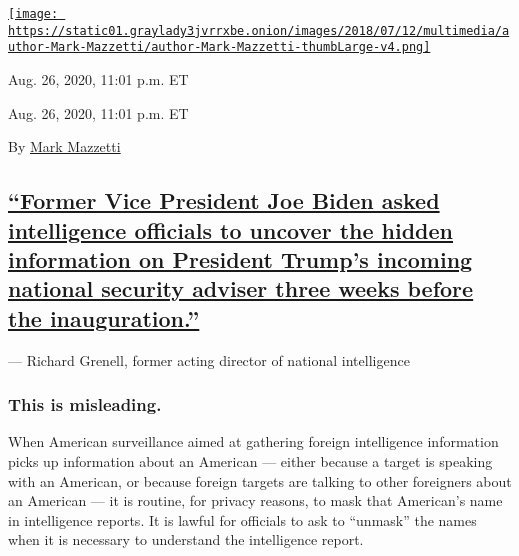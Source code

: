 \href{https://www.nytimes3xbfgragh.onion/by/mark-mazzetti}{\texttt{[image: https://static01.graylady3jvrrxbe.onion/images/2018/07/12/multimedia/author-Mark-Mazzetti/author-Mark-Mazzetti-thumbLarge-v4.png]}}

Aug. 26, 2020, 11:01 p.m. ET

Aug. 26, 2020, 11:01 p.m. ET

By \href{https://www.nytimes3xbfgragh.onion/by/mark-mazzetti}{Mark
Mazzetti}

\hypertarget{former-vice-president-joe-biden-asked-intelligence-officials-to-uncover-the-hidden-information-on-president-trumps-incoming-national-security-adviser-three-weeks-before-the-inauguration}{%
\subsection{\texorpdfstring{\protect\hyperlink{former-vice-president-joe-biden-asked-intelligence-officials-to-uncover-the-hidden-information-on-president-trumps-incoming-nati}{``Former
Vice President Joe Biden asked intelligence officials to uncover the
hidden information on President Trump's incoming national security
adviser three weeks before the
inauguration.''}}{``Former Vice President Joe Biden asked intelligence officials to uncover the hidden information on President Trump's incoming national security adviser three weeks before the inauguration.''}}\label{former-vice-president-joe-biden-asked-intelligence-officials-to-uncover-the-hidden-information-on-president-trumps-incoming-national-security-adviser-three-weeks-before-the-inauguration}}

--- Richard Grenell, former acting director of national intelligence

\hypertarget{this-is-misleading-4}{%
\subsubsection{\texorpdfstring{\textbf{This is
misleading.}}{This is misleading.}}\label{this-is-misleading-4}}

When American surveillance aimed at gathering foreign intelligence
information picks up information about an American --- either because a
target is speaking with an American, or because foreign targets are
talking to other foreigners about an American --- it is routine, for
privacy reasons, to mask that American's name in intelligence reports.
It is lawful for officials to ask to ``unmask'' the names when it is
necessary to understand the intelligence report.

